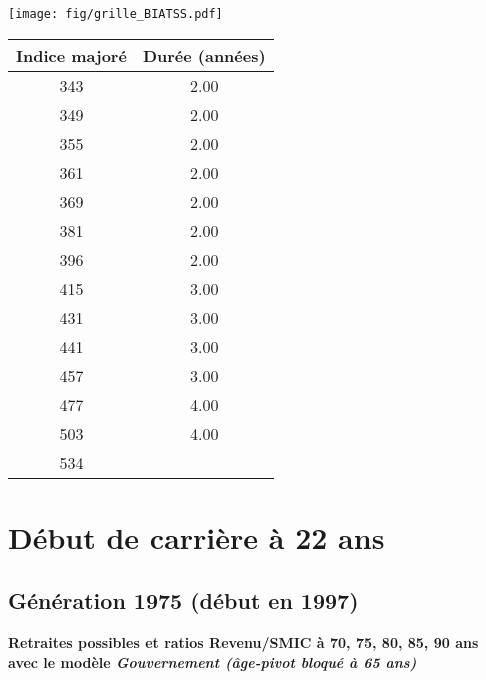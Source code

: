 \begin{minipage}{0.55\linewidth}\texttt{[image: fig/grille\_BIATSS.pdf]}\end{minipage} 
\begin{minipage}{0.3\linewidth} 
 \begin{center} 

\begin{tabular}[htb]{|c|c|} 
\hline 
 Indice majoré &  Durée (années) \\ 
\hline \hline 
 343 &  2.00 \\ 
\hline 
 349 &  2.00 \\ 
\hline 
 355 &  2.00 \\ 
\hline 
 361 &  2.00 \\ 
\hline 
 369 &  2.00 \\ 
\hline 
 381 &  2.00 \\ 
\hline 
 396 &  2.00 \\ 
\hline 
 415 &  3.00 \\ 
\hline 
 431 &  3.00 \\ 
\hline 
 441 &  3.00 \\ 
\hline 
 457 &  3.00 \\ 
\hline 
 477 &  4.00 \\ 
\hline 
 503 &  4.00 \\ 
\hline 
 534 &   \\ 
\hline 
\hline 
\end{tabular} 
\end{center} 
 \end{minipage} 


 \addto{\captionsenglish}{ \renewcommand{\mtctitle}{}} \setcounter{minitocdepth}{2} 
 \minitoc \newpage 

\section{Début de carrière à 22 ans} 

\subsection{Génération 1975 (début en 1997)} 

{\bf \noindent Retraites possibles et ratios Revenu/SMIC à 70, 75, 80, 85, 90 ans avec le modèle \emph{Gouvernement (âge-pivot bloqué à 65 ans)}}  
 
